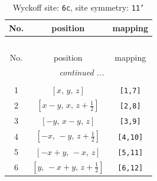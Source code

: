 \documentclass[fleqn,8pt]{jsarticle}
\begin{document}
\renewcommand{\arraystretch}{1.2}
\begin{longtable}{ccc}
\caption{Wyckoff site: {\tt 6c}, site symmetry: {\tt 11'}}
 \\
 \hline \hline
No. & position & mapping \\ \hline \endfirsthead

\multicolumn{2}{l}{\tablename\ \thetable{}} \\
 \hline \hline
No. & position & mapping \\ \hline \endhead

 \hline \hline
\multicolumn{2}{r}{\footnotesize\it continued ...} \\ \endfoot

 \hline \hline
\multicolumn{2}{r}{} \\ \endlastfoot

1 & $\left[ x,\, y,\, z \right]$ & {\tt [1,7]} \\ \hline
2 & $\left[ x - y,\, x,\, z + \frac{1}{2} \right]$ & {\tt [2,8]} \\ \hline
3 & $\left[ - y,\, x - y,\, z \right]$ & {\tt [3,9]} \\ \hline
4 & $\left[ - x,\, - y,\, z + \frac{1}{2} \right]$ & {\tt [4,10]} \\ \hline
5 & $\left[ - x + y,\, - x,\, z \right]$ & {\tt [5,11]} \\ \hline
6 & $\left[ y,\, - x + y,\, z + \frac{1}{2} \right]$ & {\tt [6,12]} \\
\end{longtable}
\end{document}
